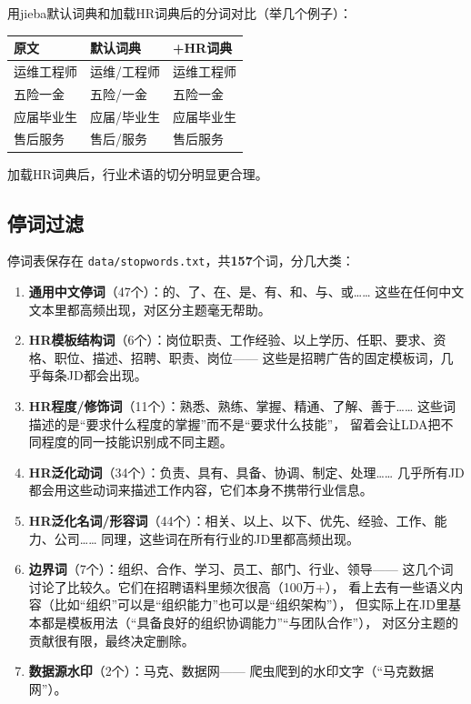 \documentclass[12pt,a4paper]{ctexart}
\begin{document}
用jieba默认词典和加载HR词典后的分词对比（举几个例子）：

\begin{table}[h]
\centering
\small
\begin{tabular}{p{5cm}p{4.5cm}p{4.5cm}}
\toprule
\textbf{原文} & \textbf{默认词典} & \textbf{+HR词典} \\
\midrule
运维工程师 & 运维/工程师 & 运维工程师 \\
五险一金 & 五险/一金 & 五险一金 \\
应届毕业生 & 应届/毕业生 & 应届毕业生 \\
售后服务 & 售后/服务 & 售后服务 \\
\bottomrule
\end{tabular}
\end{table}

加载HR词典后，行业术语的切分明显更合理。


\subsection{停词过滤}

停词表保存在 \texttt{data/stopwords.txt}，共\textbf{157}个词，分几大类：

\begin{enumerate}
\item \textbf{通用中文停词}（47个）：的、了、在、是、有、和、与、或……
这些在任何中文文本里都高频出现，对区分主题毫无帮助。

\item \textbf{HR模板结构词}（6个）：岗位职责、工作经验、以上学历、任职、要求、资格、职位、描述、招聘、职责、岗位——
这些是招聘广告的固定模板词，几乎每条JD都会出现。

\item \textbf{HR程度/修饰词}（11个）：熟悉、熟练、掌握、精通、了解、善于……
这些词描述的是``要求什么程度的掌握''而不是``要求什么技能''，
留着会让LDA把不同程度的同一技能识别成不同主题。

\item \textbf{HR泛化动词}（34个）：负责、具有、具备、协调、制定、处理……
几乎所有JD都会用这些动词来描述工作内容，它们本身不携带行业信息。

\item \textbf{HR泛化名词/形容词}（44个）：相关、以上、以下、优先、经验、工作、能力、公司……
同理，这些词在所有行业的JD里都高频出现。

\item \textbf{边界词}（7个）：组织、合作、学习、员工、部门、行业、领导——
这几个词讨论了比较久。它们在招聘语料里频次很高（100万+），
看上去有一些语义内容（比如``组织''可以是``组织能力''也可以是``组织架构''），
但实际上在JD里基本都是模板用法（``具备良好的组织协调能力''``与团队合作''），
对区分主题的贡献很有限，最终决定删除。

\item \textbf{数据源水印}（2个）：马克、数据网——
爬虫爬到的水印文字（``马克数据网''）。
\end{enumerate}
\end{document}
